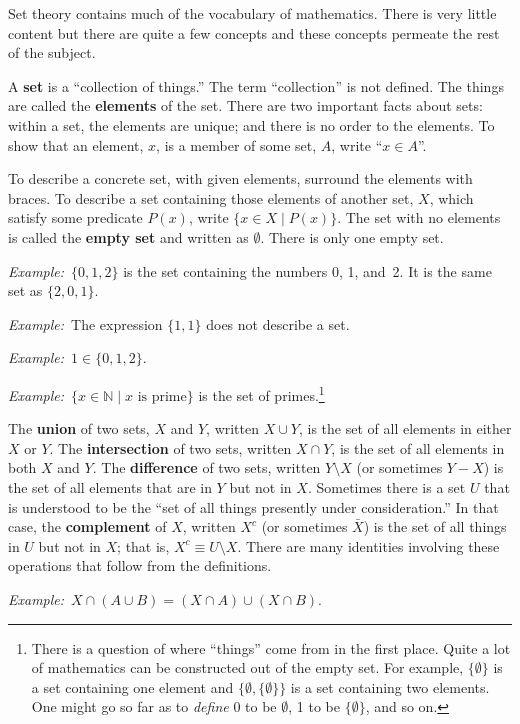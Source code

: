 \documentclass[10pt, a4paper, twocolumn]{article}
\newcommand{\defn}[1]{\textbf{#1}}
\newcommand{\eg}{\emph{Example:}\relax}
\begin{document}
Set theory contains much of the vocabulary of mathematics. There is very little
content but there are quite a few concepts and these concepts permeate the rest
of the subject.

A \defn{set} is a “collection of things.” The term “collection” is not
defined. The things are called the \defn{elements} of the set. There are two
important facts about sets: within a set, the elements are unique; and there is
no order to the elements. To show that an element, $x$, is a member of some set,
$A$, write “$x \in A$”.

To describe a concrete set, with given elements, surround the elements with
braces. To describe a set containing those elements of another set, $X$, which
satisfy some predicate $P(x)$, write $\{x \in X \mid P(x)\}$. The set with no
elements is called the \defn{empty set} and written as $\emptyset$. There is only one
empty set.

\eg\ $\{0, 1, 2\}$ is the set containing the numbers 0, 1, and~2. It is the same
set as $\{2,0,1\}$.

\eg\ The expression $\{1, 1\}$ does not describe a set.

\eg\ $1\in\{0,1,2\}$.

\eg\ $\{x \in \mathbb{N} \mid \text{$x$ is prime}\}$ is the set of
primes.\footnote{There is a question of where “things” come from in the first place. Quite a lot of
  mathematics can be constructed out of the empty set. For example, $\{\emptyset\}$ is a set containing one
  element and $\{\emptyset, \{\emptyset\}\}$ is a set containing two elements. One might go so far as to \emph{define}
  0 to be $\emptyset$, 1 to be $\{\emptyset\}$, and so on.}

The \defn{union} of two sets, $X$ and $Y$, written $X \cup Y$, is the set of all
elements in either $X$ or $Y$. The \defn{intersection} of two sets, written $X \cap
Y$, is the set of all elements in both $X$ and $Y$. The \defn{difference} of two
sets, written $Y \setminus X$ (or sometimes $Y-X$) is the set of all elements that are
in $Y$ but not in $X$. Sometimes there is a set $U$ that is understood to be the
“set of all things presently under consideration.” In that case, the
\defn{complement} of $X$, written $X^c$ (or sometimes $\bar{X}$) is the set of
all things in $U$ but not in $X$; that is, $X^c \equiv U \setminus X$. There are many
identities involving these operations that follow from the definitions.

\eg\ $X\cap(A\cup B) = (X\cap A)\cup (X\cap B)$.
\end{document}
